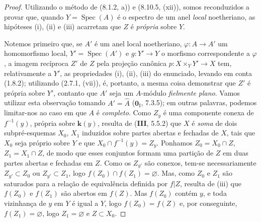\begin{proof}
Utilizando o método de (8.1.2, a)) e (8.10.5, (xii)), somos reconduzidos a provar que, quando $Y=\operatorname{Spec}(A)$ é o espectro de um anel \emph{local} noetheriano, as hipóteses (i), (ii) e (iii) acarretam que $Z$ é \emph{própria} sobre $Y$.

Notemos primeiro que, se $A'$ é um anel local noetheriano, $\varphi:A\to A'$ um homomorfismo local, $Y'=\operatorname{Spec}(A')$ e $g:Y'\to Y$ o morfismo correspondente a $\varphi$, a imagem recíproca $Z'$ de $Z$ pela projeção canônica $p:X\times_Y Y'\to X$ tem, relativamente a $Y'$, as propriedades (i), (ii), (iii) do enunciado, levando em conta (1.8.2); utilizando (2.7.1, (vii)), é, portanto, a mesma coisa demonstrar que $Z'$ é própria sobre $Y'$, contanto que $A'$ seja um $A$-módulo \emph{fielmente plano}. Vamos utilizar esta observação tomando $A'=\widehat A$ ($\mathbf{0}_{\mathrm{I}}$, 7.3.5); em outras palavras, podemos limitar-nos ao caso em que $A$ é \emph{completo}. Como $Z_y$ é uma componente conexa de $f^{-1}(y)$, própria sobre $\mathbf k(y)$, resulta de (\textbf{III}, 5.5.2) que $X$ é \emph{soma} de dois subpré-esquemas $X_0$, $X_1$ induzidos sobre partes abertas e fechadas de $X$, tais que $X_0$ seja próprio sobre $Y$ e que $X_0\cap f^{-1}(y)=Z_y$. Ponhamos $Z_0=X_0\cap Z$, $Z_1=X_1\cap Z$, de modo que esses conjuntos formam uma partição de $Z$ em duas partes abertas e fechadas em $Z$. Como os $Z_{y'}$ são conexos, tem-se necessariamente $Z_{y'}\subset Z_0$ ou $Z_{y'}\subset Z_1$, logo $f(Z_0)\cap f(Z_1)=\varnothing$. Mas, como $Z_0$ e $Z_1$ são saturados para a relação de equivalência definida por $f|Z$, resulta de (iii) que $f(Z_0)$ e $f(Z_1)$ são abertos em $f(Z)$. Mas $f(Z_0)$ contém $y$, e toda vizinhança de $y$ em $Y$ é igual a $Y$, logo $f(Z_0)=f(Z)$ e, por conseguinte, $f(Z_1)=\varnothing$, logo $Z_1=\varnothing$ e $Z\subset X_0$.


\end{proof}
